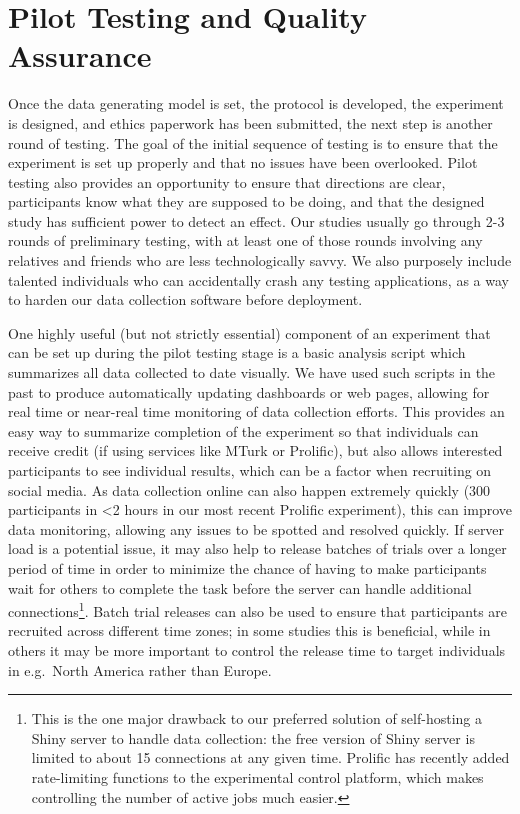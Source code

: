 \documentclass[
  10pt,
  letterpaper,
  DIV=11,
  numbers=noendperiod]{scrartcl}
\begin{document}
\section{Pilot Testing and Quality Assurance}\label{sec-pilot-test}

Once the data generating model is set, the protocol is developed, the
experiment is designed, and ethics paperwork has been submitted, the
next step is another round of testing. The goal of the initial sequence
of testing is to ensure that the experiment is set up properly and that
no issues have been overlooked. Pilot testing also provides an
opportunity to ensure that directions are clear, participants know what
they are supposed to be doing, and that the designed study has
sufficient power to detect an effect. Our studies usually go through 2-3
rounds of preliminary testing, with at least one of those rounds
involving any relatives and friends who are less technologically savvy.
We also purposely include talented individuals who can accidentally
crash any testing applications, as a way to harden our data collection
software before deployment.

One highly useful (but not strictly essential) component of an
experiment that can be set up during the pilot testing stage is a basic
analysis script which summarizes all data collected to date visually. We
have used such scripts in the past to produce automatically updating
dashboards or web pages, allowing for real time or near-real time
monitoring of data collection efforts. This provides an easy way to
summarize completion of the experiment so that individuals can receive
credit (if using services like MTurk or Prolific), but also allows
interested participants to see individual results, which can be a factor
when recruiting on social media. As data collection online can also
happen extremely quickly (300 participants in \textless2 hours in our
most recent Prolific experiment), this can improve data monitoring,
allowing any issues to be spotted and resolved quickly. If server load
is a potential issue, it may also help to release batches of trials over
a longer period of time in order to minimize the chance of having to
make participants wait for others to complete the task before the server
can handle additional connections\footnote{This is the one major
  drawback to our preferred solution of self-hosting a Shiny server to
  handle data collection: the free version of Shiny server is limited to
  about 15 connections at any given time. Prolific has recently added
  rate-limiting functions to the experimental control platform, which
  makes controlling the number of active jobs much easier.}. Batch trial
releases can also be used to ensure that participants are recruited
across different time zones; in some studies this is beneficial, while
in others it may be more important to control the release time to target
individuals in e.g.~North America rather than Europe.
\end{document}
